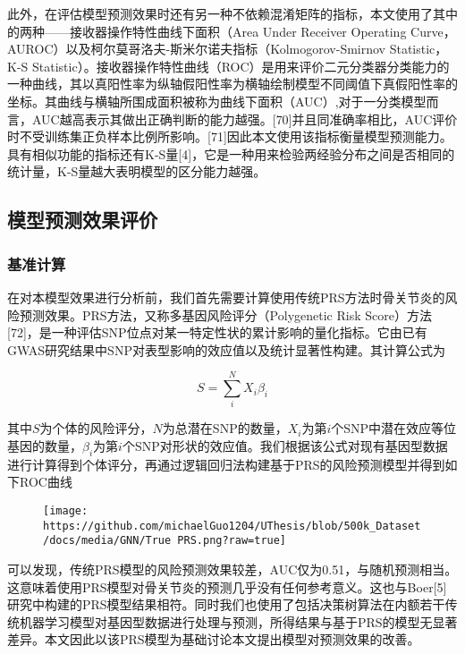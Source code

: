 \documentclass[
]{article}
\begin{document}
此外，在评估模型预测效果时还有另一种不依赖混淆矩阵的指标，本文使用了其中的两种------接收器操作特性曲线下面积（Area
Under Receiver Operating
Curve，AUROC）以及柯尔莫哥洛夫-斯米尔诺夫指标（Kolmogorov-Smirnov
Statistic，K-S
Statistic）。接收器操作特性曲线（ROC）是用来评价二元分类器分类能力的一种曲线，其以真阳性率为纵轴假阳性率为横轴绘制模型不同阈值下真假阳性率的坐标。其曲线与横轴所围成面积被称为曲线下面积（AUC）,对于一分类模型而言，AUC越高表示其做出正确判断的能力越强。{[}70{]}并且同准确率相比，AUC评价时不受训练集正负样本比例所影响。{[}71{]}因此本文使用该指标衡量模型预测能力。具有相似功能的指标还有K-S量{[}4{]}，它是一种用来检验两经验分布之间是否相同的统计量，K-S量越大表明模型的区分能力越强。

\hypertarget{ux6a21ux578bux9884ux6d4bux6548ux679cux8bc4ux4ef7}{%
\subsection{模型预测效果评价}\label{ux6a21ux578bux9884ux6d4bux6548ux679cux8bc4ux4ef7}}

\hypertarget{ux57faux51c6ux8ba1ux7b97}{%
\subsubsection{基准计算}\label{ux57faux51c6ux8ba1ux7b97}}

在对本模型效果进行分析前，我们首先需要计算使用传统PRS方法时骨关节炎的风险预测效果。PRS方法，又称多基因风险评分（Polygenetic
Risk
Score）方法{[}72{]}，是一种评估SNP位点对某一特定性状的累计影响的量化指标。它由已有GWAS研究结果中SNP对表型影响的效应值以及统计显著性构建。其计算公式为

\[S=\sum_i^N X_i \beta_i\]

其中\(S\)为个体的风险评分，\(N\)为总潜在SNP的数量，\(X_i\)为第\(i\)个SNP中潜在效应等位基因的数量，\(\beta_i\)为第\(i\)个SNP对形状的效应值。我们根据该公式对现有基因型数据进行计算得到个体评分，再通过逻辑回归法构建基于PRS的风险预测模型并得到如下ROC曲线

\begin{figure}
\centering
\texttt{[image: https://github.com/michaelGuo1204/UThesis/blob/500k\_Dataset/docs/media/GNN/True PRS.png?raw=true]}
\caption{}
\end{figure}

可以发现，传统PRS模型的风险预测效果较差，AUC仅为0.51，与随机预测相当。这意味着使用PRS模型对骨关节炎的预测几乎没有任何参考意义。这也与Boer{[}5{]}研究中构建的PRS模型结果相符。同时我们也使用了包括决策树算法在内额若干传统机器学习模型对基因型数据进行处理与预测，所得结果与基于PRS的模型无显著差异。本文因此以该PRS模型为基础讨论本文提出模型对预测效果的改善。
\end{document}
